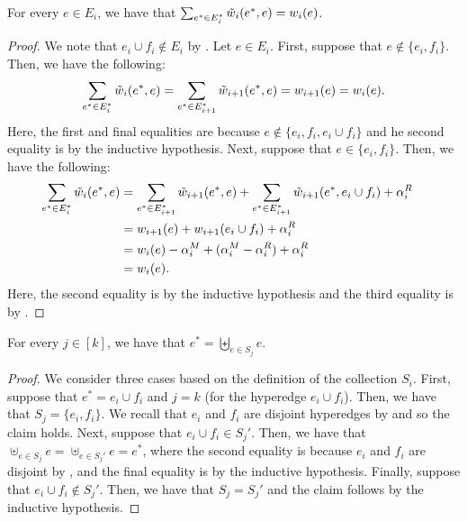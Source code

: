     \begin{claim}\label{claim:weak-to-strong:correctness:main:hyperedge-merge:property1}
        For every $e \in E_i$, we have that $\sum_{e^* \in E_i^*}\Tilde{w}_{i}(e^*, e) = w_i(e)$.
    \end{claim}
    \begin{proof}
        We note that $e_i \cup f_i \not \in E_i$ by . Let $e \in E_i$. First, suppose that $e \not \in \{e_i, f_i\}$. Then, we have the following:
        $$\sum_{e^* \in E_i^*}\Tilde{w}_{i}(e^*, e) = \sum_{e^* \in E_{i+1}^*}\Tilde{w}_{i+1}(e^*, e) = w_{i+1}(e) = w_i(e).$$
        Here, the first and final equalities are because $e \not \in \{e_i, f_i, e_i\cup f_i\}$ and he second equality is by the inductive hypothesis. Next, suppose that $e \in \{e_i, f_i\}$. Then, we have the following:
        \begin{align*}
            \sum_{e^* \in E_i^*}\Tilde{w}_i(e^*, e)&= \sum_{e^* \in E_{i+1}^*}\Tilde{w}_{i+1}(e^*, e) + \sum_{e^* \in E_{i+1}^*}\Tilde{w}_{i+1}(e^*, e_i\cup f_i) + \alpha_i^R&\\
            &= w_{i+1}(e) + w_{i+1}(e_i\cup f_i) + \alpha_i^R&\\
            & = w_i(e) - \alpha_i^M + (\alpha_i^M - \alpha_i^R) + \alpha_i^R&\\
            &= w_i(e).  &
        \end{align*}
        Here, the second equality is by the inductive hypothesis and the third equality is by .
    \end{proof}

\begin{claim}\label{claim:weak-to-strong:correctness:main:hyperedge-merge:property2}
    For every $j \in [k]$, we have that $e^* = \biguplus_{e \in S_j}e$.
\end{claim}
\begin{proof}
    We consider three cases based on the definition of the collection $S_i$. First, suppose that $e^* = e_i \cup f_i$ and $j = k$ (for the hyperedge $e_i\cup f_i$). Then, we have that $S_j = \{e_i, f_i\}$. We recall that $e_i$ and $f_i$ are disjoint hyperedges by  and so the claim holds. Next, suppose that $e_i \cup f_i \in S_j'$. Then, we have that $\uplus_{e \in S_j} e = \uplus_{e \in S_j'} e = e^*$, where the second equality is  because $e_i$ and $f_i$ are disjoint by  , and the final equality is by the inductive hypothesis. Finally, suppose that $e_i\cup f_i \not \in S_j'$. Then, we have that $S_j = S_j'$ and the claim follows by the inductive hypothesis.
\end{proof}


